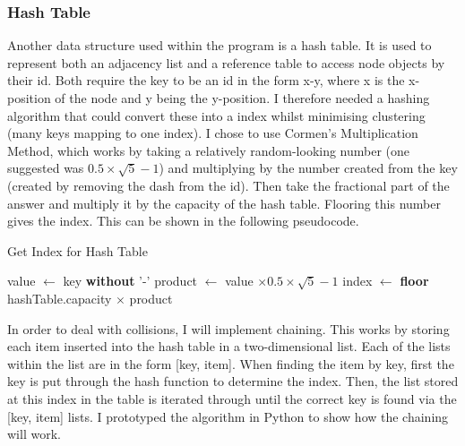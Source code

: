 \documentclass[titlepage]{article}
\begin{document}
\subsubsection{Hash Table}
Another data structure used within the program is a hash table. It is used to represent both an adjacency list and a reference table to access node objects by their id. Both require the key to be an id in the form x-y, where x is the x-position of the node and y being the y-position. I therefore needed a hashing algorithm that could convert these into a index whilst minimising clustering (many keys mapping to one index). I chose to use Cormen's Multiplication Method, which works by taking a relatively random-looking number (one suggested was $0.5 \times \sqrt{5} - 1$) and multiplying by the number created from the key (created by removing the dash from the id). Then take the fractional part of the answer and multiply it by the capacity of the hash table. Flooring this number gives the index. This can be shown in the following pseudocode.

\begin{algorithm}[H]
\caption{Get Index for Hash Table}
\begin{algorithmic}[1]
		\State value $\gets$ key \textbf{without} '-' 
		\State product $\gets$ value $ \times 0.5 \times \sqrt{5} - 1$
		\State index $\gets$ \textbf{floor} hashTable.capacity $\times$ product
	\EndProcedure
\end{algorithmic}
\end{algorithm}

In order to deal with collisions, I will implement chaining. This works by storing each item inserted into the hash table in a two-dimensional list. Each of the lists within the list are in the form [key, item]. When finding the item by key, first the key is put through the hash function to determine the index. Then, the list stored at this index in the table is iterated through until the correct key is found via the [key, item] lists. I prototyped the algorithm in Python to show how the chaining will work.
\end{document}
